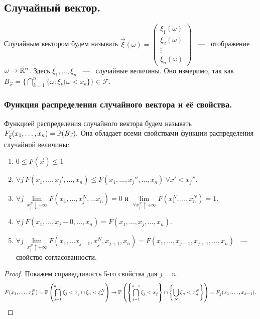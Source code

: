 \subsection{Случайный вектор.}
\begin{definition}
    Случайным вектором будем называть $\vec{\xi}(\omega) = \begin{pmatrix}
        \xi_1(\omega) \\ 
        \xi_2(\omega) \\ 
        \vdots \\ 
        \xi_n(\omega)
    \end{pmatrix}$ ~---~ отображение $\omega \rightarrow \R^n$. Здесь $\xi_1, \dots, \xi_n$ ~---~ случайные величины. Оно измеримо, так как $B_{\vec{x}} = \{ \bigcap\limits_{k = 1}^n \{\omega : \xi_k(\omega < x_k \}\} \in \mathcal{F}$.
\end{definition}
\subsubsection{Функция распределения случайного вектора и её свойства.}
\begin{definition}
    Функцией распределения случайного вектора будем называть $F_{\vec{\xi}}(x_1, \dots, x_n) = \P(B_{\vec{x}}).$ Она обладает всеми свойствами функции распределения случайной величины: 
    \begin{enumerate}
        \item $0 \le F(\vec{x}) \le 1$
        \item $\forall j\  F(x_1, \dots, x_j', \dots, x_n) \le F(x_1, \dots, x_j'', \dots, x_n) \ \forall x' < x_j''.$
        \item $\forall j \ \lim\limits_{x_j^{N} \downarrow -\infty} F(x_1, \dots, x_j^{N}, \dots x_n) = 0$ и $\lim\limits_{\forall x_j^{N} \uparrow + \infty} F(x_1^N, \dots, x_n^N) = 1.$
        \item $\forall j \ F(x_1, \dots, x_j - 0, \dots, x_n) = F(x_1, \dots, x_j, \dots, x_n).$
        \item $\forall j \ \lim\limits_{x_j^N \uparrow +\infty} F(x_1, \dots x_{j - 1}, x_j^{N}, x_{j + 1}, x_n) = F(x_1, \dots, x_{j - 1}, x_{j + 1}, \dots, x_n)$ ~---~ свойство согласованности. 
    \end{enumerate} 
\end{definition}
\begin{proof}
    Покажем справедливость 5-го свойства для $j = n.$
    \begin{gather*}
        F(x_1, \dots, x_k^{N}) = \P\left(\bigcap_{j = 1}^{n - 1} \xi_j < x_j \cap \xi_n < \xi_n^{N}\right) \rightarrow \P\left( \left\{ \bigcap_{j = 1}^{n - 1} \xi_j < x_j \right\} \cap \left\{\bigcup_{N} \xi_n < x_n^{N}\right\} \right) = F_{\tilde{\xi}}(x_1, \dots, x_{k - 1}).
    \end{gather*}
\end{proof}


